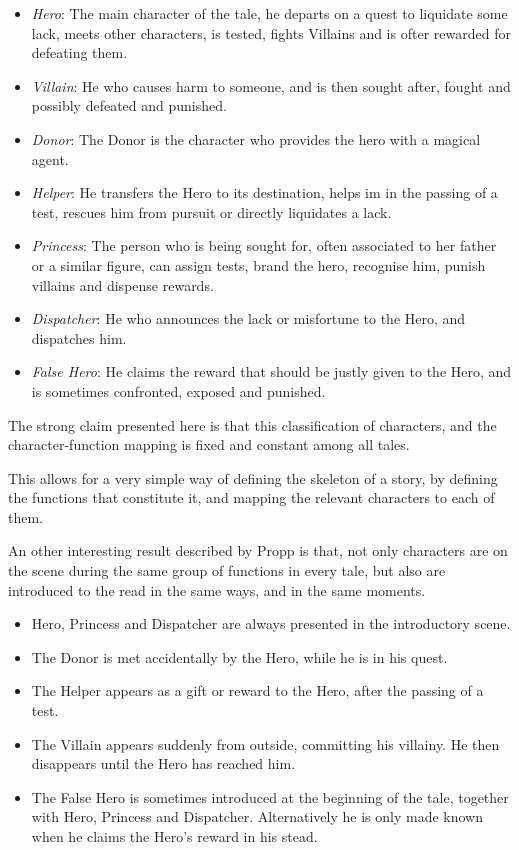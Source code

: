 \documentclass[12pt,a4paper,oneside]{report}
\begin{document}
\begin{itemize}\setlength{\itemsep}{0pt}
\item \textit{Hero}: The main character of the tale, he departs on a quest to liquidate some lack, meets other characters, is tested, fights Villains and is ofter rewarded for defeating them.
\item \textit{Villain}: He who causes harm to someone, and is then sought after, fought and possibly defeated and punished.
\item \textit{Donor}: The Donor is the character who provides the hero with a magical agent.
\item \textit{Helper}: He transfers the Hero to its destination, helps im in the passing of a test, rescues him from pursuit or directly liquidates a lack.
\item \textit{Princess}: The person who is being sought for, often associated to her father or a similar figure, can assign tests, brand the hero, recognise him, punish villains and dispense rewards.
\item \textit{Dispatcher}: He who announces the lack or misfortune to the Hero, and dispatches him.
\item \textit{False Hero}: He claims the reward that should be justly given to the Hero, and is sometimes confronted, exposed and punished.
\end{itemize}

The strong claim presented here is that this classification of characters, and the character-function mapping is fixed and constant among all tales.

This allows for a very simple way of defining the skeleton of a story, by defining the functions that constitute it, and mapping the relevant characters to each of them.

\bigskip

An other interesting result described by Propp is that, not only characters are on the scene during the same group of functions in every tale, but also are introduced to the read in the same ways, and in the same moments.

\begin{itemize}\setlength{\itemsep}{0pt}
\item Hero, Princess and Dispatcher are always presented in the introductory scene.
\item The Donor is met accidentally by the Hero, while he is in his quest.
\item The Helper appears as a gift or reward to the Hero, after the passing of a test.
\item The Villain appears suddenly from outside, committing his villainy. He then disappears until the Hero has reached him.
\item The False Hero is sometimes introduced at the beginning of the tale, together with Hero, Princess and Dispatcher. Alternatively he is only made known when he claims the Hero's reward in his stead.
\end{itemize}
\end{document}
